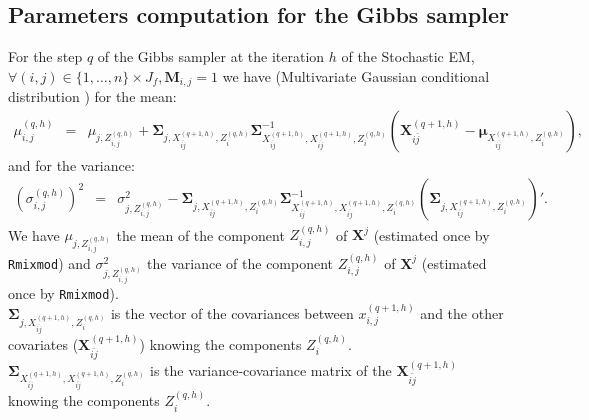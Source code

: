 \documentclass[12pt,a4paper]{report}
\begin{document}
%			
%			
			
\subsection{Parameters computation for the Gibbs sampler}	\label{gibbsparam}
					For the step $q$ of the Gibbs sampler at the iteration $h$ of the Stochastic EM, $\forall (i,j) \in \{1,\dots,n \}\times J_f,\boldsymbol{M}_{i,j}=1$
			we have (Multivariate Gaussian conditional distribution \cite{eaton1983multivariate}) for the mean:
			\begin{eqnarray}
			\mu_{i,j}^{(q,h)}&=&  \mu_{j,Z_{i,j}^{(q,h)}} + \boldsymbol{\Sigma}_{j,X_{\bar{ij}}^{(q+1,h)},Z_i^{(q,h)}}\boldsymbol{\Sigma}^{-1}_{X_{\bar{ij}}^{(q+1,h)},X_{\bar{ij}}^{(q+1,h)},Z_i^{(q,h)}}(\boldsymbol{X}_{i\bar{j}}^{(q+1,h)}-\boldsymbol{\mu}_{X_{i\bar{j}}^{(q+1,h)},Z_i^{(q,h)}}) , \nonumber 			\end{eqnarray}
			and for the variance:
\begin{eqnarray}
			(\sigma_{i,j}^{(q,h)})^2&=&\sigma_{j,Z_{i,j}^{(q,h)}}^2-\boldsymbol{\Sigma}_{j,X_{\bar{ij}}^{(q+1,h)},Z_i^{(q,h)}}\boldsymbol{\Sigma}^{-1}_{X_{\bar{ij}}^{(q+1,h)},X_{\bar{ij}}^{(q+1,h)},Z_i^{(q,h)}}(\boldsymbol{\Sigma}_{j,X_{\bar{ij}}^{(q+1,h)},Z_i^{(q,h)}})'. \nonumber 
			\end{eqnarray} 
			We have  $\mu_{j,Z_{i,j}^{(q,h)}}$ the mean of the component $Z_{i,j}^{(q,h)}$ of $\boldsymbol{X}^j$ (estimated once by {\tt Rmixmod}) and
			$\sigma_{j,Z_{i,j}^{(q,h)}}^2$ the variance of the component $Z_{i,j}^{(q,h)}$ of $\boldsymbol{X}^j$ (estimated once by {\tt Rmixmod}).\\
			$\boldsymbol{\Sigma}_{j,X_{\bar{ij}}^{(q+1,h)},Z_i^{(q,h)}}$ is the vector of the covariances between $x_{i,j}^{(q+1,h)}$ and the other covariates ($\boldsymbol{X}_{\bar{ij}}^{(q+1,h)}$) knowing the components $Z_i^{(q,h)}$.\\
			$\boldsymbol{\Sigma}_{X_{\bar{ij}}^{(q+1,h)},X_{\bar{ij}}^{(q+1,h)},Z_i^{(q,h)}}$ is the variance-covariance matrix of the $\boldsymbol{X}_{\bar{ij}}^{(q+1,h)}$ knowing the components $Z_i^{(q,h)}$.
			
\end{document}
